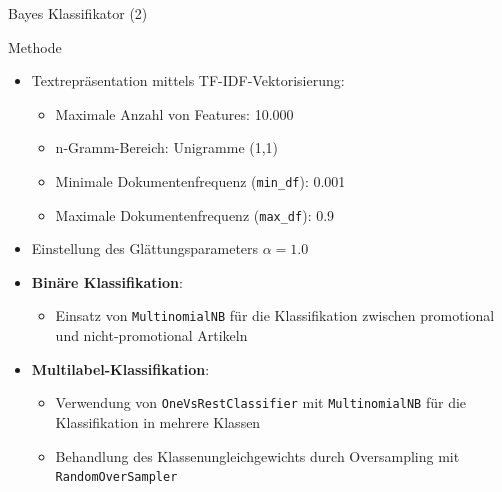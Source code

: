 \documentclass[aspectratio=169]{beamer} %
\begin{document}
\begin{frame}{Bayes Klassifikator (2)}
    \begin{block}{Methode}
        \begin{itemize}
            \item Textrepr\"asentation mittels TF-IDF-Vektorisierung:
                  \begin{itemize}
                      \item Maximale Anzahl von Features: 10.000
                      \item n-Gramm-Bereich: Unigramme (1,1)
                      \item Minimale Dokumentenfrequenz (\texttt{min\_df}): 0.001
                      \item Maximale Dokumentenfrequenz (\texttt{max\_df}): 0.9
                  \end{itemize}
            \item Einstellung des Gl\"attungsparameters \(\alpha = 1.0\)
            \item \textbf{Bin\"are Klassifikation}:
                  \begin{itemize}
                      \item Einsatz von \texttt{MultinomialNB} f\"ur die Klassifikation zwischen promotional und nicht-promotional Artikeln
                  \end{itemize}
            \item \textbf{Multilabel-Klassifikation}:
                  \begin{itemize}
                      \item Verwendung von \texttt{OneVsRestClassifier} mit \texttt{MultinomialNB} f\"ur die Klassifikation in mehrere Klassen
                      \item Behandlung des Klassenungleichgewichts durch Oversampling mit \texttt{RandomOverSampler}
                  \end{itemize}
        \end{itemize}
    \end{block}
\end{frame}
\end{document}
